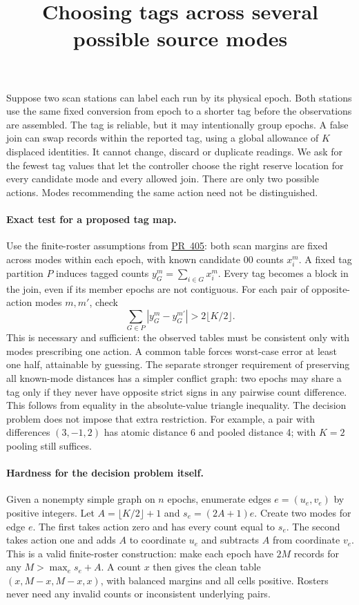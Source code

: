 \documentclass{article}
\title{Choosing tags across several possible source modes}
\date{}
\begin{document}
\maketitle
Suppose two scan stations can label each run by its physical epoch.
Both stations use the same fixed conversion from epoch to a shorter
tag before the observations are assembled. The tag is reliable, but
it may intentionally group epochs. A false join can swap records
within the reported tag, using a global allowance of $K$ displaced
identities. It cannot change, discard or duplicate readings.
We ask for the fewest tag values that let the controller choose the
right reserve location for every candidate mode and every allowed
join. There are only two possible actions. Modes recommending the
same action need not be distinguished.

\paragraph{Exact test for a proposed tag map.}
Use the finite-roster assumptions from
\href{https://github.com/eternal-november/eos-research-programmes/pull/405}{PR~405}:
both scan margins are fixed across modes within each epoch, with
known candidate $00$ counts $x^m_i$. A fixed tag partition $P$ induces
tagged counts $y_G^m=\sum_{i\in G}x_i^m$. Every tag becomes a block in
the join, even if its member epochs are not contiguous. For each
pair of opposite-action modes $m,m'$, check
\[
   \sum_{G\in P}|y_G^m-y_G^{m'}|>2\lfloor K/2\rfloor.
\]
This is necessary and sufficient: the observed tables must be
consistent only with modes prescribing one action. A common table
forces worst-case error at least one half, attainable by guessing.
The separate stronger requirement of preserving all known-mode
distances has a simpler conflict graph: two epochs may share a
tag only if they never have opposite strict signs in any pairwise
count difference. This follows from equality in the absolute-value
triangle inequality. The decision problem does not impose that
extra restriction. For example, a pair with differences $(3,-1,2)$
has atomic distance 6 and pooled distance 4; with $K=2$ pooling
still suffices.

\paragraph{Hardness for the decision problem itself.}
Given a nonempty simple graph on $n$ epochs, enumerate edges
$e=(u_e,v_e)$ by positive integers. Let $A=\lfloor K/2\rfloor+1$
and $s_e=(2A+1)e$. Create two modes for edge $e$. The first takes
action zero and has every count equal to $s_e$. The second takes
action one and adds $A$ to coordinate $u_e$ and subtracts $A$
from coordinate $v_e$. This is a valid finite-roster construction:
make each epoch have $2M$ records for any $M>\max_e s_e+A$.
A count $x$ then gives the clean table $(x,M-x,M-x,x)$, with
balanced margins and all cells positive. Rosters never need any
invalid counts or inconsistent underlying pairs.
\end{document}
